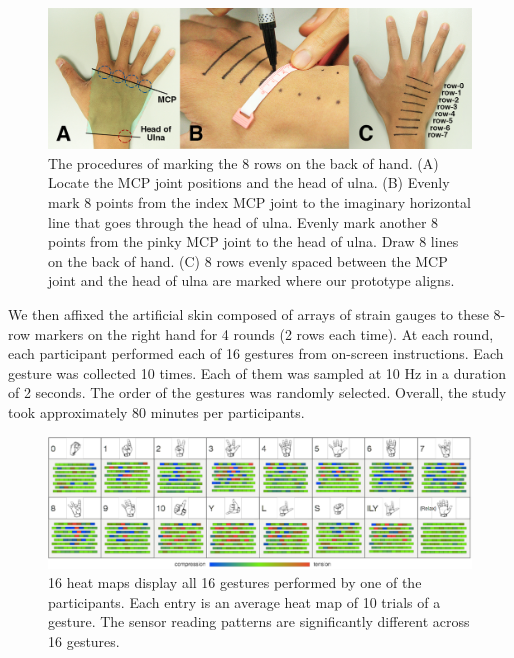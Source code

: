\documentclass{sigchi}
\begin{document}
\begin{figure}
  \begin{center}
  \includegraphics[width=1\columnwidth]{figures/studyProcedure.jpg}
  \caption{The procedures of marking the 8 rows on the back of hand.
          (A) Locate the MCP joint positions and the head of ulna. 
          (B) Evenly mark 8 points from the index MCP joint to the imaginary horizontal line that goes through the head of ulna. Evenly mark another 8 points from the pinky MCP joint to the head of ulna. Draw 8 lines on the back of hand.
          (C) 8 rows evenly spaced between the MCP joint and the head of ulna are marked where our prototype aligns.
  }
  \label{fig:studyProcedure}
  \end{center}
\end{figure}

We then affixed the artificial skin composed of arrays of strain gauges to these 8-row markers on the right hand for 4 rounds (2 rows each time). At each round, each participant performed each of 16 gestures from on-screen instructions. Each gesture was collected 10 times. Each of them was sampled at 10 Hz in a duration of 2 seconds.
The order of the gestures was randomly selected. 
Overall, the study took approximately 80 minutes per participants.
\vspace{10mm}

\begin{figure}[t]
 \begin{center}
  \includegraphics[width=2\columnwidth]{figures/user16GesturesSV_v3.pdf}
  \caption{ 16 heat maps display all 16 gestures performed by one of the participants. Each entry is an average heat map of 10 trials of a gesture. The sensor reading patterns are significantly different across 16 gestures.
  }
  \label{fig:user16GesturesSV}
  \end{center}
\end{figure}
\end{document}
